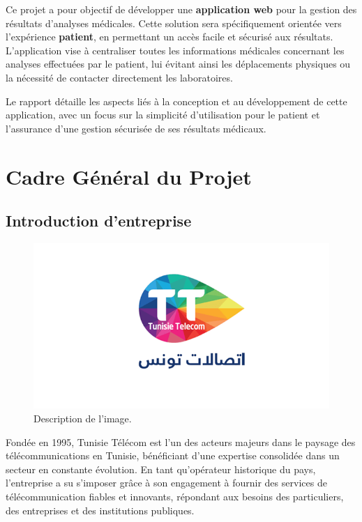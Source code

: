 \documentclass[12pt,a4paper]{report}
\begin{document}
Ce projet a pour objectif de développer une \textbf{application web} pour la gestion des résultats d'analyses médicales. Cette solution sera spécifiquement orientée vers l'expérience \textbf{patient}, en permettant un accès facile et sécurisé aux résultats. L'application vise à centraliser toutes les informations médicales concernant les analyses effectuées par le patient, lui évitant ainsi les déplacements physiques ou la nécessité de contacter directement les laboratoires.

Le rapport détaille les aspects liés à la conception et au développement de cette application, avec un focus sur la simplicité d'utilisation pour le patient et l'assurance d'une gestion sécurisée de ses résultats médicaux.

\chapter{Cadre Général du Projet}


\section{Introduction d’entreprise }
\begin{figure}[h]
    \centering
    \includegraphics[width=\textwidth]{./img/tt.png}
    \caption{Description de l'image.}
\end{figure}

Fondée en 1995, Tunisie Télécom est l'un des acteurs majeurs dans le paysage des télécommunications en Tunisie, bénéficiant d’une expertise consolidée dans un secteur en constante évolution. En tant qu’opérateur historique du pays, l’entreprise a su s’imposer grâce à son engagement à fournir des services de télécommunication fiables et innovants, répondant aux besoins des particuliers, des entreprises et des institutions publiques.
\end{document}
